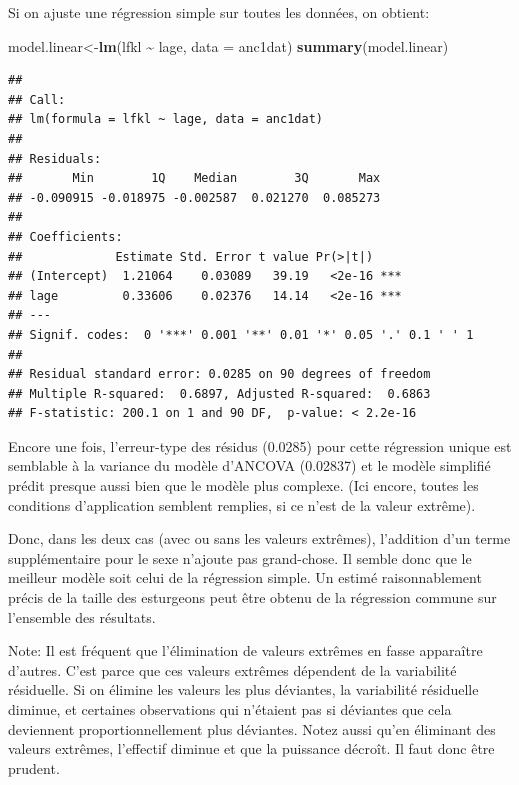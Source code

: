 \documentclass[
  12pt,
]{book}
\newenvironment{Shaded}{\begin{snugshade}}{\end{snugshade}}
\newcommand{\DataTypeTok}[1]{\textcolor[rgb]{0.13,0.29,0.53}{#1}}
\newcommand{\KeywordTok}[1]{\textcolor[rgb]{0.13,0.29,0.53}{\textbf{#1}}}
\newcommand{\NormalTok}[1]{#1}
\newcommand{\OperatorTok}[1]{\textcolor[rgb]{0.81,0.36,0.00}{\textbf{#1}}}
\newcommand{\StringTok}[1]{\textcolor[rgb]{0.31,0.60,0.02}{#1}}
\begin{document}
Si on ajuste une régression simple sur toutes les données, on obtient:

\begin{Shaded}
\begin{Highlighting}[]
\NormalTok{model.linear\textless{}{-}}\KeywordTok{lm}\NormalTok{(lfkl }\OperatorTok{\textasciitilde{}}\StringTok{ }\NormalTok{lage, }\DataTypeTok{data =}\NormalTok{ anc1dat)}
\KeywordTok{summary}\NormalTok{(model.linear)}
\end{Highlighting}
\end{Shaded}

\begin{verbatim}
## 
## Call:
## lm(formula = lfkl ~ lage, data = anc1dat)
## 
## Residuals:
##       Min        1Q    Median        3Q       Max 
## -0.090915 -0.018975 -0.002587  0.021270  0.085273 
## 
## Coefficients:
##             Estimate Std. Error t value Pr(>|t|)    
## (Intercept)  1.21064    0.03089   39.19   <2e-16 ***
## lage         0.33606    0.02376   14.14   <2e-16 ***
## ---
## Signif. codes:  0 '***' 0.001 '**' 0.01 '*' 0.05 '.' 0.1 ' ' 1
## 
## Residual standard error: 0.0285 on 90 degrees of freedom
## Multiple R-squared:  0.6897, Adjusted R-squared:  0.6863 
## F-statistic: 200.1 on 1 and 90 DF,  p-value: < 2.2e-16
\end{verbatim}

Encore une fois, l'erreur-type des résidus (0.0285) pour cette régression unique est semblable à la variance du modèle d'ANCOVA (0.02837) et le modèle simplifié prédit presque aussi bien que le modèle plus complexe. (Ici encore, toutes les conditions d'application semblent remplies, si ce n'est de la valeur extrême).

Donc, dans les deux cas (avec ou sans les valeurs extrêmes), l'addition d'un terme supplémentaire pour le sexe n'ajoute pas grand-chose. Il semble donc que le meilleur modèle soit celui de la régression simple. Un estimé raisonnablement précis de la taille des esturgeons peut être obtenu de la régression commune sur l'ensemble des résultats.

Note: Il est fréquent que l'élimination de valeurs extrêmes en fasse apparaître d'autres. C'est parce que ces valeurs extrêmes dépendent de la variabilité résiduelle. Si on élimine les valeurs les plus déviantes, la variabilité résiduelle diminue, et certaines observations qui n'étaient pas si déviantes que cela deviennent proportionnellement plus déviantes. Notez aussi qu'en éliminant des valeurs extrêmes, l'effectif diminue et que la puissance décroît. Il faut donc être prudent.
\end{document}
